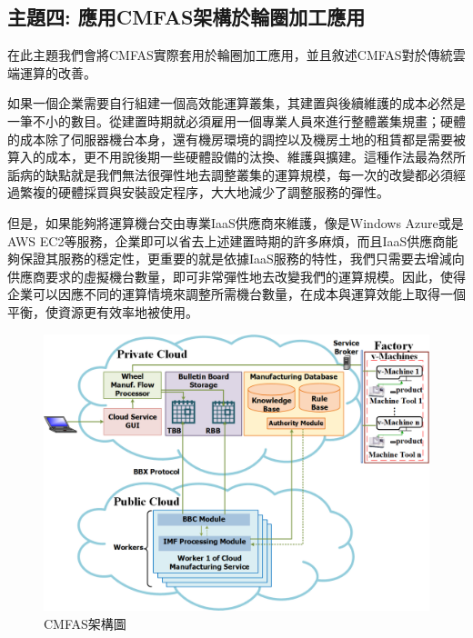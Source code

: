 \documentclass[CJK,12pt,t]{article}
\begin{document}
\begin{CJK*}{UTF8}{bkai}   %






\section{主題四: 應用CMFAS架構於輪圈加工應用}
 
		在此主題我們會將CMFAS實際套用於輪圈加工應用，並且敘述CMFAS對於傳統雲端運算的改善。
		
		如果一個企業需要自行組建一個高效能運算叢集，其建置與後續維護的成本必然是一筆不小的數目。從建置時期就必須雇用一個專業人員來進行整體叢集規畫；硬體的成本除了伺服器機台本身，還有機房環境的調控以及機房土地的租賃都是需要被算入的成本，更不用說後期一些硬體設備的汰換、維護與擴建。這種作法最為然所詬病的缺點就是我們無法很彈性地去調整叢集的運算規模，每一次的改變都必須經過繁複的硬體採買與安裝設定程序，大大地減少了調整服務的彈性。

		但是，如果能夠將運算機台交由專業IaaS供應商來維護，像是Windows Azure或是AWS EC2等服務，企業即可以省去上述建置時期的許多麻煩，而且IaaS供應商能夠保證其服務的穩定性，更重要的就是依據IaaS服務的特性，我們只需要去增減向供應商要求的虛擬機台數量，即可非常彈性地去改變我們的運算規模。因此，使得企業可以因應不同的運算情境來調整所需機台數量，在成本與運算效能上取得一個平衡，使資源更有效率地被使用。

		\begin{figure}[ht]
			\begin{center}
				\includegraphics[scale=0.4]{figs/CASE2015.png}
				\caption{CMFAS架構圖}
				\label{cmfas1}
			\end{center}
		\end{figure}


\end{CJK*}
\end{document}
